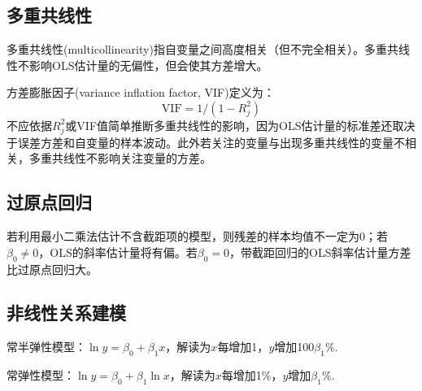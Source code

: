 \subsection{多重共线性}

\par 多重共线性(multicollinearity)指自变量之间高度相关（但不完全相关）。多重共线性不影响OLS估计量的无偏性，但会使其方差增大。
\par 方差膨胀因子(variance inflation factor, VIF)定义为：
\begin{equation}
    \text{VIF}=1/(1-R_j^2)
\end{equation}
不应依据$R^2_j$或VIF值简单推断多重共线性的影响，因为OLS估计量的标准差还取决于误差方差和自变量的样本波动。此外若关注的变量与出现多重共线性的变量不相关，多重共线性不影响关注变量的方差。

\subsection{过原点回归}
\par 若利用最小二乘法估计不含截距项的模型，则残差的样本均值不一定为0；若$\beta_0\neq 0$，OLS的斜率估计量将有偏。若$\beta_0=0$，带截距回归的OLS斜率估计量方差比过原点回归大。

\subsection{非线性关系建模}
\par 常半弹性模型：$\ln y=\beta_0+\beta_1 x$，解读为$x$每增加1，$y$增加100$\beta_1$\%.
\par 常弹性模型：$\ln y=\beta_0+\beta_1 \ln x$，解读为$x$每增加1\%，$y$增加$\beta_1$\%.
